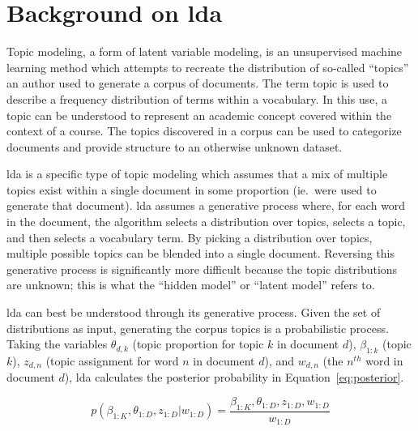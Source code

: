 \section{Background on \acf{lda}}
\label{sec:background}


Topic modeling, a form of latent variable modeling, is an unsupervised machine learning method which attempts to recreate the distribution of so-called ``topics'' an author used to generate a corpus of documents.
The term topic is used to describe a frequency distribution of terms within a vocabulary.
In this use, a topic can be understood to represent an academic concept covered within the context of a course.
The topics discovered in a corpus can be used to categorize documents and provide structure to an otherwise unknown dataset.


\acf{lda} is a specific type of topic modeling which assumes that a mix of multiple topics exist within a single document in some proportion (ie.\ were used to generate that document). \citep{Blei2003}
\ac{lda} assumes a generative process where, for each word in the document, the algorithm selects a distribution over topics, selects a topic, and then selects a vocabulary term. \citep{Blei2003}
By picking a distribution over topics, multiple possible topics can be blended into a single document.
Reversing this generative process is significantly more difficult because the topic distributions are unknown; this is what the ``hidden model'' or ``latent model'' refers to.


\ac{lda} can best be understood through its generative process.
Given the set of distributions as input, generating the corpus topics is a probabilistic process.
Taking the variables $\theta_{d,k}$ (topic proportion for topic $k$ in document $d$), $\beta_{1:k}$ (topic $k$), $z_{d,n}$ (topic assignment for word $n$ in document $d$), and $w_{d,n}$ (the $n^{th}$ word in document $d$), \ac{lda} calculates the posterior probability in Equation~\ref{eq:posterior}. \citep{Blei2012}

\begin{equation}
p(\beta_{1:K}, \theta_{1:D},z_{1:D} | w_{1:D}) = \frac{\beta_{1:K},
\theta_{1:D},z_{1:D}, w_{1:D}}{w_{1:D}}
\label{eq:posterior}
\end{equation}

